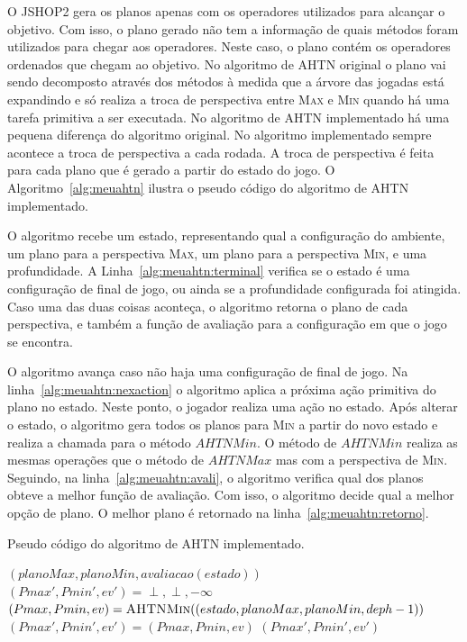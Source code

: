 O JSHOP2 gera os planos apenas com os operadores utilizados para alcançar o objetivo.
Com isso, o plano gerado não tem a informação de quais métodos foram utilizados para chegar aos operadores.
Neste caso, o plano contém os operadores ordenados que chegam ao objetivo.
No algoritmo de AHTN original o plano vai sendo decomposto através dos métodos à medida que a árvore das jogadas está expandindo e só realiza a troca de perspectiva entre \textsc{Max} e \textsc{Min} quando há uma tarefa primitiva a ser executada.
No algoritmo de AHTN implementado há uma pequena diferença do algoritmo original.
No algoritmo implementado sempre acontece a troca de perspectiva a cada rodada.
A troca de perspectiva é feita para cada plano que é gerado a partir do estado do jogo.
O Algoritmo~\ref{alg:meuahtn} ilustra o pseudo código do algoritmo de AHTN implementado.

O algoritmo recebe um estado, representando qual a configuração do ambiente, um plano para a perspectiva \textsc{Max}, um plano para a perspectiva \textsc{Min}, e uma profundidade.
A Linha~\ref{alg:meuahtn:terminal} verifica se o estado é uma configuração de final de jogo, ou ainda se a profundidade configurada foi atingida.
Caso uma das duas coisas aconteça, o algoritmo retorna o plano de cada perspectiva, e também a função de avaliação para a configuração em que o jogo se encontra.

O algoritmo avança caso não haja uma configuração de final de jogo.
Na linha~\ref{alg:meuahtn:nexaction} o algoritmo aplica a próxima ação primitiva do plano no estado.
Neste ponto, o jogador realiza uma ação no estado.
Após alterar o estado, o algoritmo gera todos os planos para \textsc{Min} a partir do novo estado e realiza a chamada para o método $\mathit{AHTNMin}$.
O método de $\mathit{AHTNMin}$ realiza as mesmas operações que o método de $\mathit{AHTNMax}$ mas com a perspectiva de \textsc{Min}.
Seguindo, na linha~\ref{alg:meuahtn:avali}, o algoritmo verifica qual dos planos obteve a melhor função de avaliação. 
Com isso, o algoritmo decide qual a melhor opção de plano.
O melhor plano é retornado na linha~\ref{alg:meuahtn:retorno}.


\begin{algorithm}[ht]
	\caption{Pseudo código do algoritmo de AHTN implementado.}
	\label{alg:meuahtn}
 	\begin{algorithmic}[1]		
	 		 \label{alg:meuahtn:terminal}
		 		\State	\Return $(planoMax, planoMin, avaliacao(estado))$
	 		\EndIf
	 		 \label{alg:meuahtn:nexaction}
	 		\State $(Pmax', Pmin', ev') = \perp, \perp, -\infty$
			 \label{alg:meuahtn:for}
		 		\State $(Pmax, Pmin, ev) = \Call{AHTNMin}{(estado, planoMax, planoMin, deph-1)}$ \label{alg:meuahtn:ahtnmin}
			 	 \label{alg:meuahtn:avali}
					\State $(Pmax', Pmin', ev') = (Pmax, Pmin, ev)$
				\EndIf		 		 		
		 	\EndFor
		 	\State \Return $(Pmax', Pmin', ev')$ \label{alg:meuahtn:retorno}
 		\EndFunction
 	\end{algorithmic}
 \end{algorithm}
 
